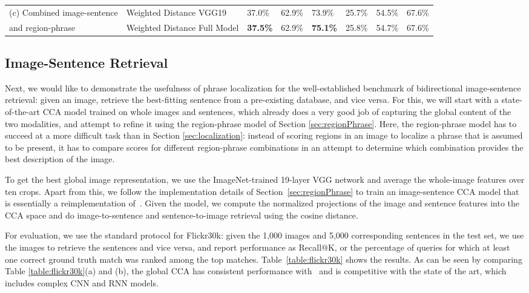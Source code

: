 \documentclass[twocolumn]{svjour3}
\begin{document}
\begin{table*}[t]
\begin{center}
\begin{tabular}{|l|l|l|l|l|l|l|l|}
(c) Combined image-sentence & {{Weighted Distance VGG19}}  & { 37.0\% }       & { 62.9\%}        & { 73.9\%}      & { {25.7\%}}      & { {54.5\%}}    & { {67.6\%}} \\ 
and region-phrase & {{Weighted Distance Full Model}}  & { \textbf{37.5\%}}       & { 62.9\%}        & { \textbf{75.1\%}}      & { 25.8\%}      & { 54.7\%}    & { 67.6\%} \\ 
\hline
\end{tabular}
\end{center}
\end{table*}





\subsection{Image-Sentence Retrieval}
\label{sec:retrieval}
Next, we would like to demonstrate the usefulness of phrase localization for the well-established benchmark of bidirectional image-sentence retrieval: given an image, retrieve the best-fitting sentence from a pre-existing database, and vice versa. For this, we will start with a state-of-the-art CCA model trained on whole images and sentences, which already does a very good job of capturing the global content of the two modalities, and attempt to refine it using the region-phrase model of Section \ref{sec:regionPhrase}. Here, the region-phrase model has to succeed at a more difficult task than in Section \ref{sec:localization}: instead of scoring regions in an image to localize a phrase that is assumed to be present, it has to compare scores for different region-phrase combinations in an attempt to determine which combination provides the best description of the image.

To get the best global image representation, we use the ImageNet-trained 19-layer VGG network and average the whole-image features over ten crops. Apart from this, we follow the implementation details of Section~\ref{sec:regionPhrase} to train an image-sentence CCA model that is essentially a reimplementation of~\cite{klein2014fisher}. Given the model, we compute the normalized projections of the image and sentence features into the CCA space and do image-to-sentence and sentence-to-image retrieval using the cosine distance.

For evaluation, we use the standard protocol for Flickr30k: given the 1,000 images and 5,000 corresponding sentences in the test set, we use the images to retrieve the sentences and vice versa, and report performance as Recall@K, or the percentage of queries for which at least one correct ground truth match was ranked among the top  matches. Table~\ref{table:flickr30k} shows the results. As can be seen by comparing Table \ref{table:flickr30k}(a) and (b), the global CCA has consistent performance with~\cite{klein2014fisher} and is competitive with the state of the art, which includes complex CNN and RNN models.
\end{document}
